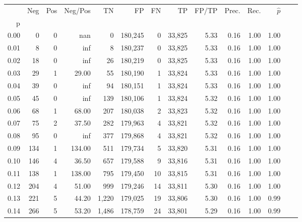 \begin{tabular}{rrrrrrrrrrrrrr}
\toprule
{} &    Neg &  Pos & Neg/Pos &       TN &       FP &      FN &      TP & FP/TP & Prec. &  Rec. & $\hat{p}$ \\
p    &        &      &         &          &          &         &         &       &       &       &           \\
\midrule
0.00 &      0 &    0 &     nan &        0 &  180,245 &       0 &  33,825 &  5.33 &  0.16 &  1.00 &      1.00 \\
0.01 &      8 &    0 &     inf &        8 &  180,237 &       0 &  33,825 &  5.33 &  0.16 &  1.00 &      1.00 \\
0.02 &     18 &    0 &     inf &       26 &  180,219 &       0 &  33,825 &  5.33 &  0.16 &  1.00 &      1.00 \\
0.03 &     29 &    1 &   29.00 &       55 &  180,190 &       1 &  33,824 &  5.33 &  0.16 &  1.00 &      1.00 \\
0.04 &     39 &    0 &     inf &       94 &  180,151 &       1 &  33,824 &  5.33 &  0.16 &  1.00 &      1.00 \\
0.05 &     45 &    0 &     inf &      139 &  180,106 &       1 &  33,824 &  5.32 &  0.16 &  1.00 &      1.00 \\
0.06 &     68 &    1 &   68.00 &      207 &  180,038 &       2 &  33,823 &  5.32 &  0.16 &  1.00 &      1.00 \\
0.07 &     75 &    2 &   37.50 &      282 &  179,963 &       4 &  33,821 &  5.32 &  0.16 &  1.00 &      1.00 \\
0.08 &     95 &    0 &     inf &      377 &  179,868 &       4 &  33,821 &  5.32 &  0.16 &  1.00 &      1.00 \\
0.09 &    134 &    1 &  134.00 &      511 &  179,734 &       5 &  33,820 &  5.31 &  0.16 &  1.00 &      1.00 \\
0.10 &    146 &    4 &   36.50 &      657 &  179,588 &       9 &  33,816 &  5.31 &  0.16 &  1.00 &      1.00 \\
0.11 &    138 &    1 &  138.00 &      795 &  179,450 &      10 &  33,815 &  5.31 &  0.16 &  1.00 &      1.00 \\
0.12 &    204 &    4 &   51.00 &      999 &  179,246 &      14 &  33,811 &  5.30 &  0.16 &  1.00 &      1.00 \\
0.13 &    221 &    5 &   44.20 &    1,220 &  179,025 &      19 &  33,806 &  5.30 &  0.16 &  1.00 &      0.99 \\
0.14 &    266 &    5 &   53.20 &    1,486 &  178,759 &      24 &  33,801 &  5.29 &  0.16 &  1.00 &      0.99 \\

\end{tabular}
